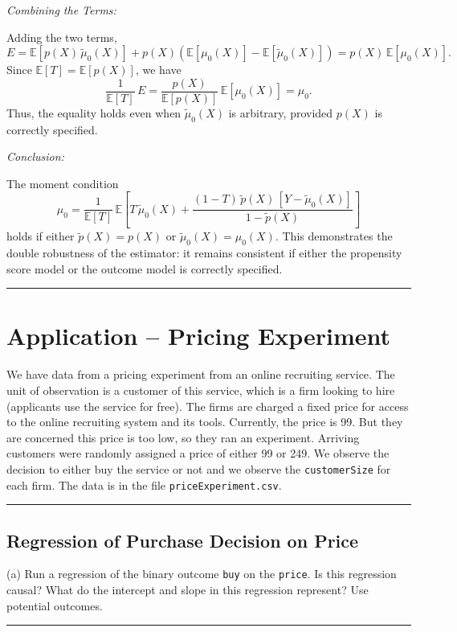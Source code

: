 \documentclass{article}
\newenvironment{colorparagraph}[1]{\par\color{#1}}{\par}
\begin{document}
\textit{Combining the Terms:}

Adding the two terms,
\[
E = \mathbb{E} \left[ p(X) \, \tilde{\mu}_0(X) \right] + p(X) \left( \mathbb{E}[ \mu_0(X) ] - \mathbb{E}[ \tilde{\mu}_0(X) ] \right) = p(X) \, \mathbb{E}[ \mu_0(X) ].
\]
Since \( \mathbb{E}[T] = \mathbb{E}[ p(X) ] \), we have
\[
\frac{1}{\mathbb{E}[T]} \, E = \frac{ p(X) }{ \mathbb{E}[ p(X) ] } \, \mathbb{E}[ \mu_0(X) ] = \mu_0.
\]
Thus, the equality holds even when \( \tilde{\mu}_0(X) \) is arbitrary, provided \( p(X) \) is correctly specified.

\textit{Conclusion:}

The moment condition
\[
\mu_0 = \frac{1}{\mathbb{E}[T]} \, \mathbb{E} \left[ T \, \tilde{\mu}_0(X) + \frac{(1 - T) \, \tilde{p}(X) \, [Y - \tilde{\mu}_0(X)]}{1 - \tilde{p}(X)} \right]
\]
holds if either \( \tilde{p}(X) = p(X) \) or \( \tilde{\mu}_0(X) = \mu_0(X) \). This demonstrates the double robustness of the estimator: it remains consistent if either the propensity score model or the outcome model is correctly specified.

\begin{colorparagraph}{questioncolor}
\rule{\textwidth}{0.5pt}

\label{q3}\section{Application -- Pricing Experiment}

We have data from a pricing experiment from an online recruiting service. The unit of observation is a customer of this service, which is a firm looking to hire (applicants use the service for free). The firms are charged a fixed price for access to the online recruiting system and its tools. Currently, the price is 99. But they are concerned this price is too low, so they ran an experiment. Arriving customers were randomly assigned a price of either 99 or 249. We observe the decision to either buy the service or not and we observe the \texttt{customerSize} for each firm. The data is in the file \texttt{priceExperiment.csv}.

\rule{\textwidth}{0.5pt}
\end{colorparagraph}

\begin{colorparagraph}{questioncolor}
\label{q3a}\subsection{Regression of Purchase Decision on Price}
(a) Run a regression of the binary outcome \texttt{buy} on the \texttt{price}. Is this regression causal? What do the intercept and slope in this regression represent? Use potential outcomes.

\rule{\textwidth}{0.5pt}
\end{colorparagraph}
\end{document}
